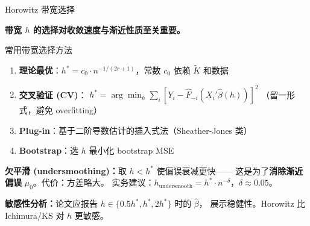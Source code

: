 \documentclass[aspectratio=169, 10pt]{beamer}
\begin{document}
\begin{frame}{Horowitz 带宽选择}

  \textbf{带宽 $h$ 的选择对收敛速度与渐近性质至关重要。}

  \begin{definitionbox}{{常用带宽选择方法}}
    \begin{enumerate}\setlength{\itemsep}{1pt}
      \item \textbf{理论最优}：$h^{*} = c_0 \cdot n^{-1/(2r+1)}$，常数 $c_0$ 依赖 $\tilde K$ 和数据
      \item \textbf{交叉验证 (CV)}：
      $h^{*} = \arg\min_h \sum_i [Y_i - \hat F_{-i}(X_i'\hat\beta(h))]^2$
      （留一形式，避免 overfitting）
      \item \textbf{Plug-in}：基于二阶导数估计的插入式法（Sheather-Jones 类）
      \item \textbf{Bootstrap}：选 $h$ 最小化 bootstrap MSE
    \end{enumerate}
  \end{definitionbox}

  \begin{highlightbox}
    \textbf{欠平滑 (undersmoothing)：}取 $h < h^{*}$ 使偏误衰减更快——
    这是为了\textbf{消除渐近偏误} $\mu_0$。代价：方差略大。
    实务建议：$h_{\text{undersmooth}} = h^{*} \cdot n^{-\delta}$，$\delta \approx 0.05$。
  \end{highlightbox}

  \begin{keybox}
    \textbf{敏感性分析：}论文应报告 $h \in \{0.5h^{*}, h^{*}, 2h^{*}\}$ 时的 $\hat\beta$，
    展示稳健性。Horowitz 比 Ichimura/KS 对 $h$ 更敏感。
  \end{keybox}

\end{frame}
\end{document}
